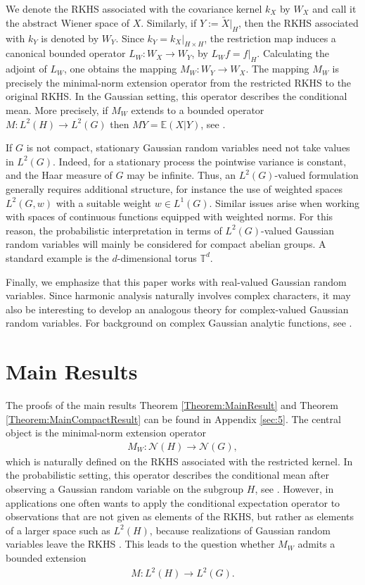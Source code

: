 \documentclass{article}
\newcommand{\E}{\mathbb{E}}
\begin{document}
We denote the RKHS associated with the covariance kernel $k_X$ by $W_X$ and call it the abstract Wiener space of $X$. 
Similarly, if $Y:=\tilde{X}|_H$, then the RKHS associated with $k_Y$ is denoted by $W_Y$. Since $k_Y=k_X|_{H \times H}$, the restriction map induces a canonical bounded operator $L_W:W_X \to W_Y$, by $L_W f= f|_H$. 
Calculating the adjoint of $L_W$, one obtains the mapping $M_W:W_Y \to W_{X}$. The mapping $M_W$ is precisely the minimal-norm extension operator from the restricted RKHS to the original RKHS. In the Gaussian setting, this operator describes the conditional mean. 
More precisely, if $M_W$ extends to a bounded operator $M:L^2(H) \to L^2(G) $ then $MY=\E(X|Y)$, see \cite{WinkleAnalysis}.


If $G$ is not compact, stationary Gaussian random variables need not take values in $L^2(G)$. 
Indeed, for a stationary process the pointwise variance is constant, and the Haar measure of $G$ may be infinite. Thus, an $L^2(G)$-valued formulation generally requires additional structure, for instance the use of weighted spaces $L^2(G,w)$ with a suitable weight $w\in L^1(G)$. Similar issues arise when working with spaces of continuous functions equipped with weighted norms. For this reason, the probabilistic interpretation in terms of $L^2(G)$-valued Gaussian random variables will mainly be considered for compact abelian groups. A standard example is the $d$-dimensional torus $\mathbb T^d$.

Finally, we emphasize that this paper works with real-valued Gaussian random variables. Since harmonic analysis naturally involves complex characters, it may also be interesting to develop an analogous theory for complex-valued Gaussian random variables. For background on complex Gaussian analytic functions, see \cite{hough2009zeros}.

\section{Main Results}\label{sec:results}
The proofs of the main results Theorem \ref{Theorem:MainResult} and Theorem \ref{Theorem:MainCompactResult} can be found in Appendix \ref{sec:5}.
The central object is the minimal-norm extension operator
\begin{align*}
    M_W:\mathcal N(H)\to\mathcal N(G),
\end{align*}
which is naturally defined on the RKHS associated with the restricted kernel. In the probabilistic setting, this operator describes the conditional mean after observing a Gaussian random variable on the subgroup $H$, see \cite{WinkleAnalysis}. However, in applications one often wants to apply the conditional expectation operator to observations that are not given as elements of the RKHS, but rather as elements of a larger space such as $L^2(H)$, because realizations of Gaussian random variables leave the RKHS \cite{driscoll1973reproducing,lukic2001stochastic}. This leads to the question whether $M_W$ admits a bounded extension
\begin{align*}
    M:L^2(H)\to L^2(G).
\end{align*}
\end{document}
